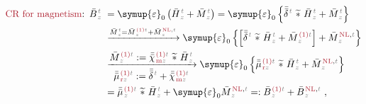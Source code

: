 \begin{subequations} \label{eq:cr-b}
\begin{align}
	\textcolor{Maroon}{\text{CR for magnetism}}\text{:}&\hspace{0.5em} \bar{B}^{\;\!\mathcolor{gray}{t}}_{\;\!\mathcolor{gray}{z}} \hspace{-0.7em} &&={\symup{\varepsilon}}_0 \left( \bar{H}^{\;\!\mathcolor{gray}{t}}_{\;\!\mathcolor{gray}{z}} + \bar{M}^{\;\!\mathcolor{gray}{t}}_{\;\!\mathcolor{gray}{z}} \right) = {\symup{\varepsilon}}_0 \left\{ \bar{\bar{\delta}}^{\;\!\mathcolor{gray}{t}}~\widetilde *~\bar{H}^{\;\!\mathcolor{gray}{t}}_{\;\!\mathcolor{gray}{z}} + \bar{M}^{\;\!\mathcolor{gray}{t}}_{\;\!\mathcolor{gray}{z}} \right\} \label{cr-b1} \\ 
	& &&\xrightarrow[]{\bar{M}^{\;\!\mathcolor{gray}{t}}_{\;\!\mathcolor{gray}{z}} = \bar{M}^{\;\!\textcolor{Maroon}{\text{(1)}} \mathcolor{gray}{t}}_{\;\!\mathcolor{gray}{z}} + \bar{M}^{\;\!\textcolor{Maroon}{\text{NL}}, \mathcolor{gray}{t}}_{\;\!\mathcolor{gray}{z}}} {\symup{\varepsilon}}_0 \left\{ \left[ \bar{\bar{\delta}}^{\;\!\mathcolor{gray}{t}}~\widetilde *~\bar{H}^{\;\!\mathcolor{gray}{t}}_{\;\!\mathcolor{gray}{z}} + \bar{M}^{\;\!\textcolor{Maroon}{\text{(1)}} \mathcolor{gray}{t}}_{\;\!\mathcolor{gray}{z}} \right] + \bar{M}^{\;\!\textcolor{Maroon}{\text{NL}}, \mathcolor{gray}{t}}_{\;\!\mathcolor{gray}{z}} \right\} \label{cr-b2} \\ 
	& &&\xrightarrow[\displaystyle{ \bar{\bar{\mu}}^{\;\!\textcolor{Maroon}{\text{(1)}} \mathcolor{gray}{t}}_{\;\!\textcolor{Maroon}{\text{r}}\mathcolor{gray}{z}} := \bar{\bar{\delta}}^{\;\!\mathcolor{gray}{t}} + \bar{\bar{\chi}}^{\;\!\textcolor{Maroon}{\text{(1)}}\mathcolor{gray}{t}}_{\;\!\textcolor{Maroon}{\text{m}} \mathcolor{gray}{z}}}]{\displaystyle{\bar{M}^{\;\!\textcolor{Maroon}{\text{(1)}} \mathcolor{gray}{t}}_{\;\!\mathcolor{gray}{z}} := \bar{\bar{\chi}}^{\;\!\textcolor{Maroon}{\text{(1)}}\mathcolor{gray}{t}}_{\;\!\textcolor{Maroon}{\text{m}} \mathcolor{gray}{z}} ~\widetilde *~\bar{H}^{\;\!\mathcolor{gray}{t}}_{\;\!\mathcolor{gray}{z}}}} {\symup{\varepsilon}}_0 \left\{ \bar{\bar{\mu}}^{\;\!\textcolor{Maroon}{\text{(1)}} \mathcolor{gray}{t}}_{\;\!\textcolor{Maroon}{\text{r}}\mathcolor{gray}{z}}~\widetilde *~\bar{H}^{\;\!\mathcolor{gray}{t}}_{\;\!\mathcolor{gray}{z}} + \bar{M}^{\;\!\textcolor{Maroon}{\text{NL}}, \mathcolor{gray}{t}}_{\;\!\mathcolor{gray}{z}} \right\} \label{cr-b3} \\ 
	& &&= \bar{\bar{\mu}}^{\;\!\textcolor{Maroon}{\text{(1)}} \mathcolor{gray}{t}}_{\;\!\mathcolor{gray}{z}}~\widetilde *~\bar{H}^{\;\!\mathcolor{gray}{t}}_{\;\!\mathcolor{gray}{z}} + {\symup{\varepsilon}}_0 \bar{M}^{\;\!\textcolor{Maroon}{\text{NL}}, \mathcolor{gray}{t}}_{\;\!\mathcolor{gray}{z}} =: \bar{B}^{\;\!\textcolor{Maroon}{\text{(1)}} \mathcolor{gray}{t}}_{\;\!\mathcolor{gray}{z}} + \bar{B}^{\;\!\textcolor{Maroon}{\text{NL}}, \mathcolor{gray}{t}}_{\;\!\mathcolor{gray}{z}}~, \label{cr-b4}
\end{align}
\end{subequations}
